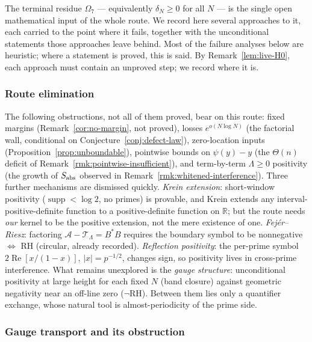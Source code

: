 \documentclass[11pt]{amsart}
\theoremstyle{definition}
\theoremstyle{remark}
\theoremstyle{definition}
\renewcommand{\Re}{\operatorname{Re}}
\newcommand{\R}{\mathbb{R}}
\begin{document}
The terminal residue $\Omega_7$ --- equivalently $\delta_N\ge0$ for all $N$ --- is the single open mathematical
input of the whole route.  We record here several approaches to it, each carried to the point where
it fails, together with the unconditional statements those approaches leave behind.  Most of the
failure analyses below are heuristic; where a statement is proved, this is said.  By
Remark~\ref{lem:live-H0}, each approach must contain an unproved step; we record where it is.

\subsubsection*{Route elimination}

The following obstructions, not all of them proved, bear on this route: fixed margins (Remark~\ref{cor:no-margin}, not proved), losses $e^{o(N\log N)}$ (the
factorial wall, conditional on Conjecture~\ref{conj:defect-law}), zero-location inputs (Proposition~\ref{prop:unboundable}), pointwise bounds on
$\psi(y)-y$ (the $\Theta(n)$ deficit of Remark~\ref{rmk:pointwise-insufficient}), and term-by-term
$\Lambda\ge0$ positivity (the growth of $S_{\rm abs}$ observed in Remark~\ref{rmk:whitened-interference}).  Three
further mechanisms are dismissed quickly.  \emph{Krein extension}: short-window positivity
($\operatorname{supp}<\log2$, no primes) is provable, and Krein extends any interval-positive-definite
function to a positive-definite function on $\R$; but the route needs \emph{our} kernel to be the
positive extension, not the mere existence of one.  \emph{Fej\'er--Riesz}: factoring
$\mathcal A-\mathcal T_\Lambda=B^*B$ requires the boundary symbol to be nonnegative $\iff$ RH (circular,
already recorded).  \emph{Reflection positivity}: the per-prime symbol $2\Re[x/(1-x)]$, $|x|=p^{-1/2}$,
changes sign, so positivity lives in cross-prime interference.  What remains unexplored is the
\emph{gauge structure}: unconditional positivity at large height for each fixed $N$ (band closure)
against geometric negativity near an off-line zero ($\neg$RH).  Between them lies only a quantifier
exchange, whose natural tool is almost-periodicity of the prime side.

\subsubsection*{Gauge transport and its obstruction}
\end{document}
